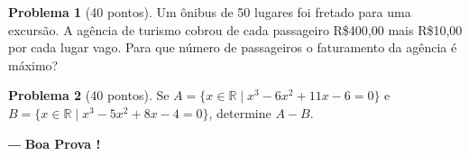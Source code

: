 \documentclass[a4paper]{article}
\theoremstyle{definition}
\newtheorem{questao}{Problema}
\begin{document}
    \begin{questao}[40 pontos]
        Um \^onibus de 50 lugares foi fretado para uma excurs\~ao. A ag\^encia de
        turismo cobrou de cada passageiro R\$400,00 mais R\$10,00 por cada
        lugar vago.  Para que n\'umero de passageiros o faturamento da ag\^encia \'e
        m\'aximo?
    \end{questao}

    \begin{questao}[40 pontos]
        Se $A = \{x \in \mathbb{R} \mid x^3 - 6x^2 + 11x - 6 = 0\}$ e $B = \{x
        \in \mathbb{R} \mid x^3 - 5x^2 + 8x - 4 = 0\}$, determine $A-B$.
    \end{questao}
	
	\vfill{\hfill{― \bf Boa Prova !}}
	
\end{document}
